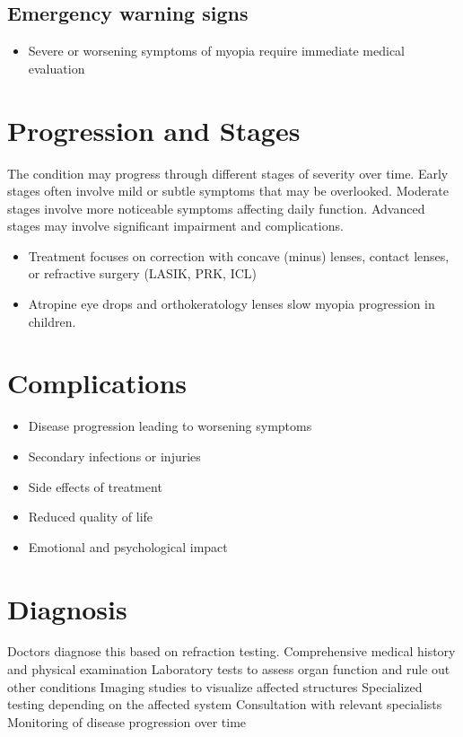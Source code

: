 \subsection{Emergency warning signs}
\begin{itemize}[noitemsep]
  \item Severe or worsening symptoms of myopia require immediate medical evaluation
\end{itemize}
\section{Progression and Stages}
The condition may progress through different stages of severity over time. Early stages often involve mild or subtle symptoms that may be overlooked. Moderate stages involve more noticeable symptoms affecting daily function. Advanced stages may involve significant impairment and complications.

\begin{itemize}[noitemsep]
  \item Treatment focuses on correction with concave (minus) lenses, contact lenses, or refractive surgery (LASIK, PRK, ICL)
  \item Atropine eye drops and orthokeratology lenses slow myopia progression in children.
\end{itemize}
\section{Complications}
\begin{itemize}[noitemsep]
  \item Disease progression leading to worsening symptoms
  \item Secondary infections or injuries
  \item Side effects of treatment
  \item Reduced quality of life
  \item Emotional and psychological impact
\end{itemize}
\section{Diagnosis}
Doctors diagnose this based on refraction testing. Comprehensive medical history and physical examination Laboratory tests to assess organ function and rule out other conditions Imaging studies to visualize affected structures Specialized testing depending on the affected system Consultation with relevant specialists Monitoring of disease progression over time

